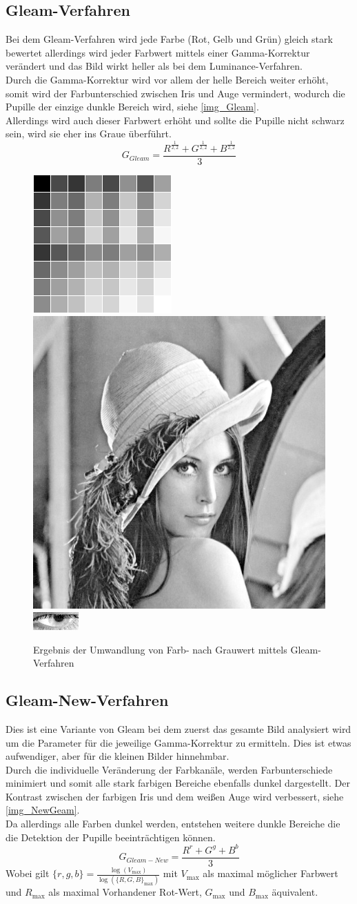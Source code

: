 \subsection{Gleam-Verfahren}
\label{gray_Gleam}
Bei dem Gleam-Verfahren wird jede Farbe (Rot, Gelb und Grün) gleich stark bewertet allerdings wird jeder Farbwert mittels einer Gamma-Korrektur verändert und das Bild wirkt heller als bei dem Luminance-Verfahren.\\
Durch die Gamma-Korrektur wird vor allem der helle Bereich weiter erhöht, somit wird der Farbunterschied zwischen Iris und Auge vermindert, wodurch die Pupille der einzige dunkle Bereich wird, siehe \autoref{img_Gleam}.\\
Allerdings wird auch dieser Farbwert erhöht und sollte die Pupille nicht schwarz sein, wird sie eher ins Graue überführt.\cite{rgb_to_Gray}\\
\[G_{Gleam}=\dfrac{R^{\frac{1}{2,2}} + G^{\frac{1}{2,2}} + B^{\frac{1}{2,2}}}{3}\]
\begin{figure}
	\centering
	\includegraphics[width=0.19\linewidth]{img/Farbkarte2}
	\includegraphics[width=0.19\linewidth]{img/Lena2}
	\includegraphics[width=0.19\linewidth]{img/Auge_2Gray}
	\caption{Ergebnis der Umwandlung von Farb- nach Grauwert mittels Gleam-Verfahren}
	\label{img_Gleam}
\end{figure}
\subsection{Gleam-New-Verfahren}
\label{gray_New}
Dies ist eine Variante von Gleam bei dem zuerst das gesamte Bild analysiert wird um die Parameter für die jeweilige Gamma-Korrektur zu ermitteln. Dies ist etwas aufwendiger, aber für die kleinen Bilder hinnehmbar.\\
Durch die individuelle Veränderung der Farbkanäle, werden Farbunterschiede minimiert und somit alle stark farbigen Bereiche ebenfalls dunkel dargestellt. Der Kontrast zwischen der farbigen Iris und dem weißen Auge wird verbessert, siehe \autoref{img_NewGeam}.\\
Da allerdings alle Farben dunkel werden, entstehen weitere dunkle Bereiche die die Detektion der Pupille beeinträchtigen können.
\[G_{Gleam-New}=\dfrac{R^{r} + G^{g} + B^{b}}{3}\]
Wobei gilt $\{r,g,b\} = \frac{\log(V_{\max})}{\log(\{R,G,B\}_{\max})}$ mit $V_{\max}$ als maximal möglicher Farbwert und $R_{\max}$ als maximal Vorhandener Rot-Wert, $G_{\max}$ und $B_{\max}$ äquivalent.

